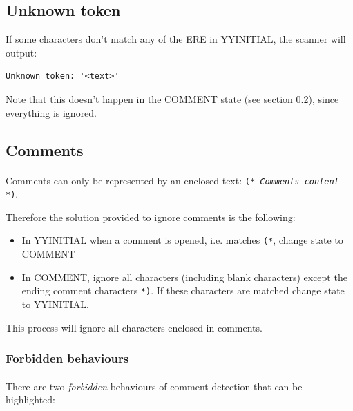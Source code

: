 \documentclass[letterpaper]{article}
\begin{document}
\subsection{Unknown token}

If some characters don't match any of the ERE in YYINITIAL, the scanner
will output:

\begin{lstlisting}[frame=single]
Unknown token: '<text>'
\end{lstlisting}

Note that this doesn't happen in the COMMENT state (see section \ref{comment}),
since everything is ignored.

\subsection{Comments}
\label{comment}

\paragraph{}

Comments can only be represented by an enclosed text:
 \texttt{(* \textit{Comments content} *)}.

Therefore the solution provided to ignore comments is the following:
\begin{itemize}

\item In YYINITIAL when a comment is opened, i.e. matches \texttt{(*},
change state to COMMENT

\item In COMMENT, ignore all characters
(including blank characters) except the ending comment
characters \texttt{*)}.
If these characters are matched change state to YYINITIAL.

\end{itemize}

This process will ignore all characters enclosed in comments.

\subsubsection{Forbidden behaviours}
\label{comment_forbidden}
\paragraph{}
There are two \textit{forbidden}
behaviours of comment detection that can be highlighted:
\end{document}
